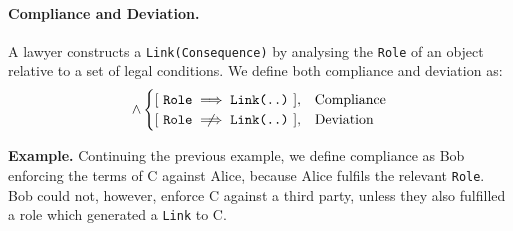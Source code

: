 \documentclass{article}
\numberwithin{equation}{section}
\newcommand{\quickexample}[1]{
\begin{tcolorbox}[%
    enhanced, 
    breakable,
    frame hidden,
    overlay broken = {
	\draw[line width=0.01mm, black, rounded corners] (frame.north west) rectangle (frame.south east);
},
    ]{}
	\textbf{Example.} #1
\end{tcolorbox}
}
\begin{document}
\paragraph{Compliance and Deviation.} A lawyer constructs a \texttt{Link(Consequence)} by analysing the \texttt{Role} of an object relative to a set of legal conditions. We define both compliance and deviation as:
\begin{equation}
[ \ \exists \ \texttt{Link(Existence, Consequence)} \ ] \land 
	\begin{cases}
		[ \ \texttt{Role} \implies \texttt{Link(..)} \ ], & \text{Compliance} \\
		[ \ \texttt{Role} \centernot\implies \texttt{Link(..)} \ ], & \text{Deviation}
	\end{cases}
\end{equation}

\vspace{0.25cm}
\quickexample{
	Continuing the previous example, we define compliance as Bob enforcing the terms of C against Alice, because Alice fulfils the relevant \texttt{Role}. Bob could not, however, enforce C against a third party, unless they also fulfilled a role which generated a \texttt{Link} to C.
}


\end{document}
